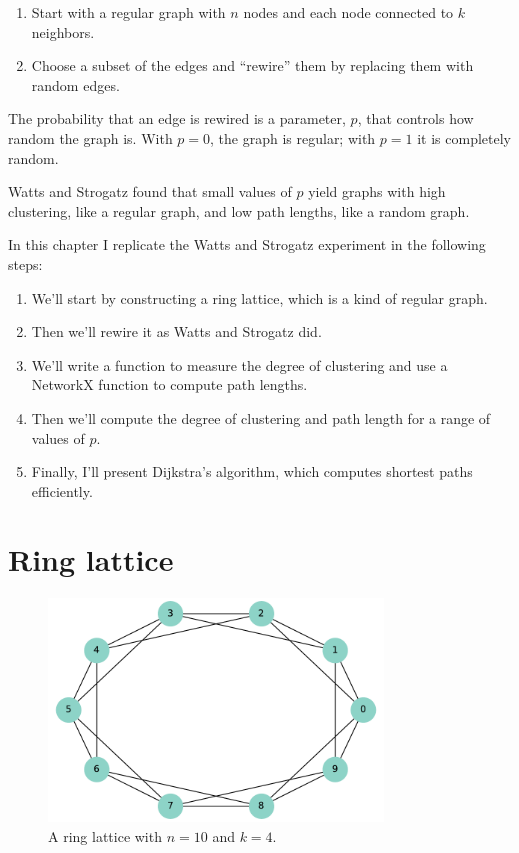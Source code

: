 \documentclass[12pt]{book}
\theoremstyle{exercise}
\begin{document}
\begin{enumerate}

\item Start with a regular graph with $n$ nodes and each node
  connected to $k$ neighbors.

\item Choose a subset of the edges and ``rewire'' them by
  replacing them with random edges.

\end{enumerate}

The probability that an edge is rewired is a parameter, $p$,
that controls how random the graph is.  With $p=0$, the graph
is regular; with $p=1$ it is completely random.

Watts and Strogatz found that small values of $p$ yield graphs
with high clustering, like a regular graph, and low path
lengths, like a random graph.

In this chapter I replicate the Watts and Strogatz experiment
in the following steps:

\begin{enumerate}

\item We'll start by constructing a ring lattice, which is a kind
of regular graph.

\item Then we'll rewire it as Watts and Strogatz did.

\item We'll write a function to measure the degree of clustering
and use a NetworkX function to compute path lengths.

\item Then we'll compute the degree of clustering and path length for
a range of values of $p$.

\item Finally, I'll present Dijkstra's algorithm, which computes shortest paths efficiently.

\end{enumerate}


\section{Ring lattice}

\begin{figure}
\centerline{\includegraphics[width=3.5in]{figs/chap03-1.pdf}}
\caption{A ring lattice with $n=10$ and $k=4$.}
\label{chap03-1}
\end{figure}
\end{document}
